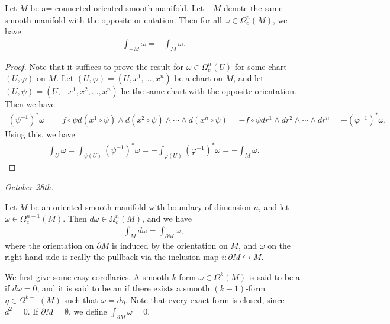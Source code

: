 \begin{proposition}
    Let $M$ be a= connected oriented smooth manifold. Let $-M$ denote the same smooth manifold with the opposite orientation. Then for all $\omega \in \Omega^{n}_{c}(M)$, we have
    \begin{align}
        \int_{-M} \omega = -\int_{M} \omega.
    \end{align}
\end{proposition}
\begin{proof}
    Note that it suffices to prove the result for $\omega \in \Omega^{n}_{c}(U)$ for some chart $(U,\varphi)$ on $M$. Let $(U,\varphi) = (U,x^{1},\ldots,x^{n})$ be a chart on $M$, and let $(U,\psi) = (U,-x^{1},x^{2},\ldots,x^{n})$ be the same chart with the opposite orientation. Then we have
    \begin{align}
        (\psi^{-1})^{\ast}\omega &= f \circ \psi d(x^{1} \circ \psi) \wedge d(x^{2} \circ \psi) \wedge \cdots \wedge d(x^{n} \circ \psi) = -f \circ \psi dr^{1} \wedge dr^{2} \wedge \cdots \wedge dr^{n} = -(\varphi^{-1})^{\ast}\omega.
    \end{align}
    Using this, we have
    \begin{align}
        \int_{U} \omega = \int_{\psi(U)} (\psi^{-1})^{\ast}\omega = -\int_{\varphi(U)} (\varphi^{-1})^{\ast}\omega = -\int_{M} \omega.
    \end{align}
\end{proof}

\textit{October 28th.}

\begin{theorem}
    Let $M$ be an oriented smooth manifold with boundary of dimension $n$, and let $\omega \in \Omega^{n-1}_{c}(M)$. Then $d\omega \in \Omega^{n}_{c}(M)$, and we have
    \begin{align}
        \int_{M} d\omega = \int_{\partial M} \omega,
    \end{align}
    where the orientation on $\partial M$ is induced by the orientation on $M$, and $\omega$ on the right-hand side is really the pullback via the inclusion map $i:\partial M \hookrightarrow M$.
\end{theorem}

We first give some easy corollaries. A smooth $k$-form $\omega \in \Omega^{k}(M)$ is said to be a  if $d\omega = 0$, and it is said to be an  if there exists a smooth $(k-1)$-form $\eta \in \Omega^{k-1}(M)$ such that $\omega = d\eta$. Note that every exact form is closed, since $d^{2} = 0$. If $\partial M = \emptyset$, we define $\int_{\partial M} \omega = 0$.

